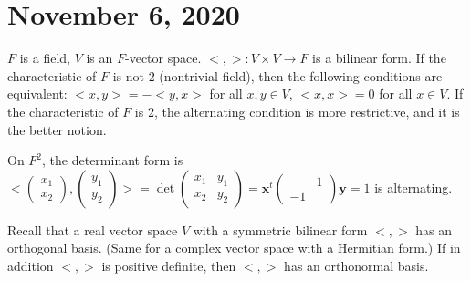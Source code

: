 \documentclass{article}
\newcommand{\ra}[1][]{\xrightarrow{#1}}
\begin{document}
\section{November 6, 2020}
$F$ is a field, $V$ is an $F$-vector space. $<,>:V\times V\ra F$ is a bilinear form. If the characteristic of $F$ is not 2 (nontrivial field), then the following conditions are equivalent: $<x,y>=-<y,x>$ for all $x,y\in V$, $<x,x>=0$ for all $x\in V$. If the characteristic of $F$ is 2, the alternating condition is more restrictive, and it is the better notion.
\begin{example}
On $F^2$, the determinant form is $<\begin{pmatrix}x_1\\x_2\end{pmatrix},\begin{pmatrix}y_1\\y_2\end{pmatrix}>=\det\begin{pmatrix}x_1&y_1\\x_2&y_2\end{pmatrix}=\mathbf{x}^t\begin{pmatrix}&1\\-1&\end{pmatrix}\mathbf{y}=1$ is alternating.
\end{example}
Recall that a real vector space $V$ with a symmetric bilinear form $<,>$ has an orthogonal basis. (Same for a complex vector space with a Hermitian form.) If in addition $<,>$ is positive definite, then $<,>$ has an orthonormal basis.
\end{document}
